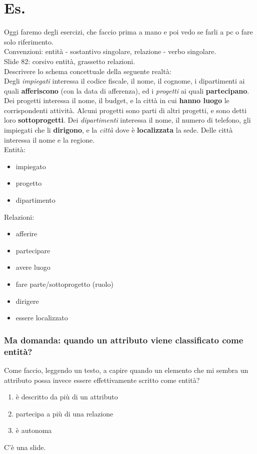 \section{Es.}
Oggi faremo degli esercizi, che faccio prima a mano e poi vedo se farli a pc o fare solo riferimento.
\\Convenzioni: entità - sostantivo singolare, relazione - verbo singolare.
\\Slide 82: corsivo entità, grassetto relazioni.
\\Descrivere lo schema concettuale della seguente realtà:
\\Degli \textit{impiegati} interessa il codice fiscale, il nome, il cognome, i dipartimenti ai quali \textbf{afferiscono} (con la data di afferenza), ed i \textit{progetti} ai quali \textbf{partecipano}. Dei progetti interessa il nome, il budget, e la città in cui \textbf{hanno luogo} le corrispondenti attività. Alcuni progetti sono parti di altri progetti, e sono detti loro \textbf{sottoprogetti}. Dei \textit{dipartimenti} interessa il nome, il numero di telefono, gli impiegati che li \textbf{dirigono}, e la \textit{città} dove è \textbf{localizzata} la sede. Delle città interessa il nome e la regione.
\\Entità:
\begin{itemize}
    \item impiegato
    \item progetto
    \item dipartimento
\end{itemize}
Relazioni:
\begin{itemize}
    \item afferire
    \item partecipare
    \item avere luogo
    \item fare parte/sottoprogetto (ruolo)
    \item dirigere
    \item essere localizzato
\end{itemize}

\subsubsection{Ma domanda: quando un attributo viene classificato come entità?}
Come faccio, leggendo un testo, a capire quando un elemento che mi sembra un attributo possa invece essere effettivamente scritto come entità?
\begin{enumerate}
    \item è descritto da più di un attributo
    \item partecipa a più di una relazione
    \item è autonoma
\end{enumerate}
C'è una slide.

